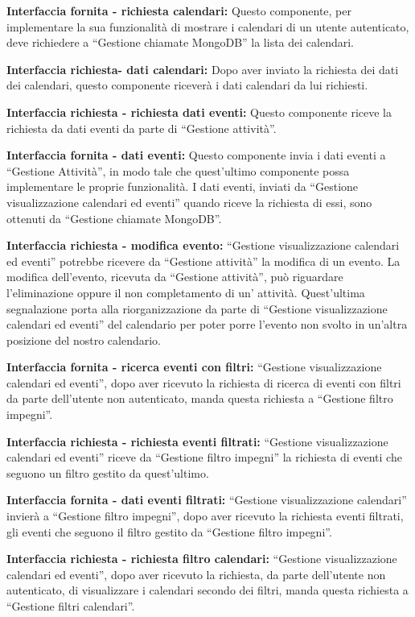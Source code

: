 \begin{listaPersonale}[]{}
    \textbf{Interfaccia fornita - richiesta calendari:} Questo componente, per implementare la sua funzionalità di mostrare i calendari di un utente autenticato, deve richiedere a “Gestione chiamate MongoDB” la lista dei calendari.

    \textbf{Interfaccia richiesta- dati calendari:} Dopo aver inviato la richiesta dei dati dei calendari, questo componente riceverà i dati calendari da lui richiesti.

    \textbf{Interfaccia richiesta - richiesta dati eventi:} Questo componente riceve la richiesta da dati eventi da parte di “Gestione attività”.

    \textbf{Interfaccia fornita - dati eventi:} Questo componente invia i dati eventi a “Gestione Attività”, in modo tale che quest'ultimo componente possa implementare le proprie funzionalità. I dati eventi, inviati da “Gestione visualizzazione calendari ed eventi” quando riceve la richiesta di essi, sono ottenuti da “Gestione chiamate MongoDB”.

    \textbf{Interfaccia richiesta - modifica evento:} “Gestione visualizzazione calendari ed eventi” potrebbe ricevere da “Gestione attività” la modifica di un evento. La modifica dell'evento, ricevuta da “Gestione attività”, può riguardare l'eliminazione oppure il non completamento di un' attività. Quest'ultima segnalazione porta alla riorganizzazione da parte di “Gestione visualizzazione calendari ed eventi” del calendario per poter porre l'evento non svolto in un'altra posizione del nostro calendario.

    \textbf{Interfaccia fornita - ricerca eventi con filtri:} “Gestione visualizzazione calendari ed eventi”, dopo aver ricevuto la richiesta di ricerca di eventi con filtri da parte dell'utente non autenticato, manda questa richiesta a “Gestione filtro impegni”.

    \textbf{Interfaccia richiesta - richiesta eventi filtrati:} “Gestione visualizzazione calendari ed eventi” riceve da “Gestione filtro impegni” la richiesta di eventi che seguono un filtro gestito da quest'ultimo.

    \textbf{Interfaccia fornita - dati eventi filtrati:} “Gestione visualizzazione calendari” invierà  a “Gestione filtro impegni”, dopo aver ricevuto la richiesta eventi filtrati, gli eventi che seguono il filtro gestito da “Gestione filtro impegni”.

    \textbf{Interfaccia richiesta - richiesta filtro calendari:} “Gestione visualizzazione calendari ed eventi”, dopo aver ricevuto la richiesta, da parte dell'utente non autenticato, di visualizzare i calendari secondo dei filtri, manda questa richiesta a “Gestione filtri calendari”.


\end{listaPersonale}
